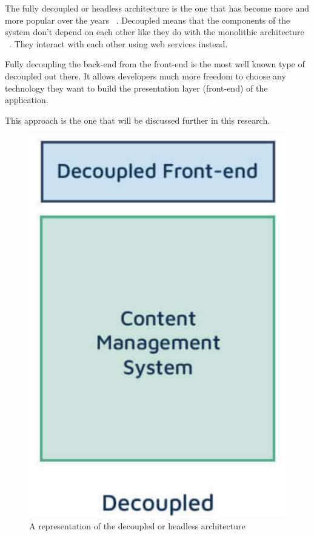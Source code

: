 The fully decoupled or headless architecture is the one that has become more and more popular over the years ~\autocite{Dropsolid2021}. Decoupled means that the components of the system don't depend on each other like they do with the monolithic architecture ~\autocite{So2018}. They interact with each other using web services instead.

Fully decoupling the back-end from the front-end is the most well known type of decoupled out there. It allows developers much more freedom to choose any technology they want to build the presentation layer (front-end) of the application.

This approach is the one that will be discussed further in this research.

\begin{figure}
	\centering
	\includegraphics{./img/Headless_Architecture}
	\caption[Headless CMS architecture]{A representation of the decoupled or headless architecture ~\autocite{Dropsolid2021}}
\end{figure}

